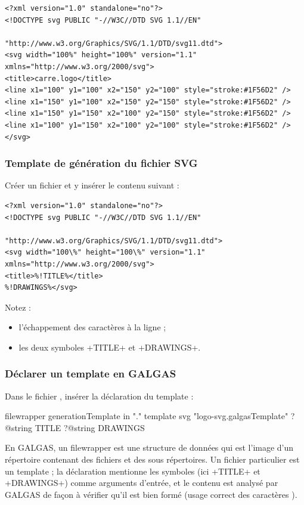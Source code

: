 {\singlespacing
\begin{verbatim}
<?xml version="1.0" standalone="no"?>
<!DOCTYPE svg PUBLIC "-//W3C//DTD SVG 1.1//EN"
                              "http://www.w3.org/Graphics/SVG/1.1/DTD/svg11.dtd">
<svg width="100%" height="100%" version="1.1" xmlns="http://www.w3.org/2000/svg">
<title>carre.logo</title>
<line x1="100" y1="100" x2="150" y2="100" style="stroke:#1F56D2" />
<line x1="150" y1="100" x2="150" y2="150" style="stroke:#1F56D2" />
<line x1="150" y1="150" x2="100" y2="150" style="stroke:#1F56D2" />
<line x1="100" y1="150" x2="100" y2="100" style="stroke:#1F56D2" />
</svg>
\end{verbatim}
}

\subsubsection{Template de génération du fichier SVG}
Créer un fichier  et y insérer le contenu suivant :
{\singlespacing
\begin{verbatim}
<?xml version="1.0" standalone="no"?>
<!DOCTYPE svg PUBLIC "-//W3C//DTD SVG 1.1//EN"
                                "http://www.w3.org/Graphics/SVG/1.1/DTD/svg11.dtd">
<svg width="100\%" height="100\%" version="1.1" xmlns="http://www.w3.org/2000/svg">
<title>%!TITLE%</title>
%!DRAWINGS%</svg>
\end{verbatim}
}


Notez :
\begin{itemize}
  \item l'échappement des caractères \tpp{\%} à la ligne  ;
  \item les deux symboles \ggs+TITLE+ et \ggs+DRAWINGS+.
\end{itemize}

\subsubsection{Déclarer un template en GALGAS}
Dans le fichier , insérer la déclaration du template :
\begin{galgas}
filewrapper generationTemplate in "." {
}{
}{
  template svg "logo-svg.galgasTemplate"
    ?@string TITLE
    ?@string DRAWINGS
}
\end{galgas}

En GALGAS, un filewrapper est une structure de données qui est l'image d'un répertoire contenant des fichiers et des sous répertoires. Un fichier particulier est un template ; la déclaration mentionne les symboles (ici \ggs+TITLE+ et \ggs+DRAWINGS+) comme arguments d'entrée, et le contenu est analysé par GALGAS de façon à vérifier qu'il est bien formé (usage correct des caractères \tpp{\%}).

